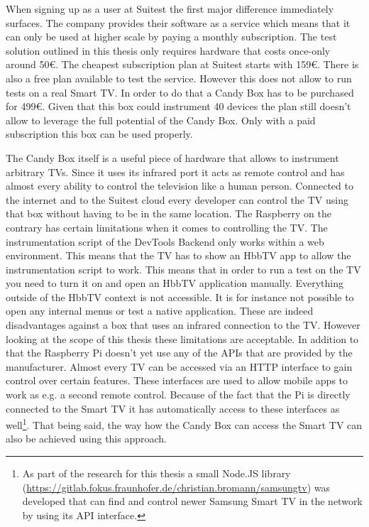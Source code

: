 When signing up as a user at Suitest the first major difference immediately surfaces. The company provides their software
as a service which means that it can only be used at higher scale by paying a monthly subscription. The test solution
outlined in this thesis only requires hardware that costs once-only around 50\euro. The cheapest subscription plan
at Suitest starts with 159\euro. There is also a free plan available to test the service. However this does not allow
to run tests on a real Smart TV. In order to do that a Candy Box has to be purchased for 499\euro. Given that this
box could instrument 40 devices the plan still doesn't allow to leverage the full potential of the Candy Box. Only
with a paid subscription this box can be used properly.

The Candy Box itself is a useful piece of hardware that allows to instrument arbitrary TVs. Since it uses its infrared
port it acts as remote control and has almost every ability to control the television like a human person. Connected
to the internet and to the Suitest cloud every developer can control the TV using that box without having
to be in the same location. The Raspberry on the contrary has certain limitations when it comes to controlling the TV.
The instrumentation script of the DevTools Backend only works within a web environment. This means that the TV has to
show an HbbTV app to allow the instrumentation script to work. This means that in order to run a test on the TV you
need to turn it on and open an HbbTV application manually. Everything outside of the HbbTV context is not accessible.
It is for instance not possible to open any internal menus or test a native application. These are indeed disadvantages
against a box that uses an infrared connection to the TV. However looking at the scope of this thesis these limitations
are acceptable. In addition to that the Raspberry Pi doesn't yet use any of the APIs that are provided by the
manufacturer. Almost every TV can be accessed via an HTTP interface to gain control over certain features. These
interfaces are used to allow mobile apps to work as e.g. a second remote control. Because of the fact that the Pi is
directly connected to the Smart TV it has automatically access to these interfaces as well\footnote{As part of the
research for this thesis a small Node.JS library (\url{https://gitlab.fokus.fraunhofer.de/christian.bromann/samsungtv})
was developed that can find and control newer Samsung Smart TV in the network by using its API interface.}. That being
said, the way how the Candy Box can access the Smart TV can also be achieved using this approach.

